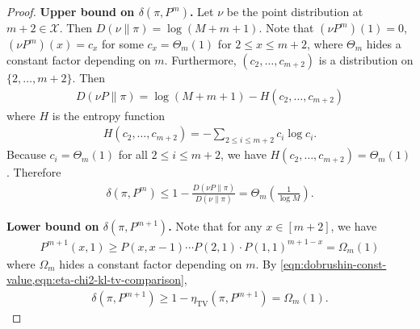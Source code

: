 \documentclass[11pt]{article}
\def\cX{\mathcal{X}}
\DeclareMathOperator\TV{\mathrm{TV}}
\theoremstyle{definition}
\begin{document}
\begin{proof}
  \textbf{Upper bound on $\delta\left(\pi, P^m\right)$.}
  Let $\nu$ be the point distribution at $m+2\in \cX$. Then $D(\nu \| \pi) = \log (M+m+1)$.
  Note that $(\nu P^m)(1)=0$, $(\nu P^m)(x) = c_x$ for some $c_x = \Theta_m(1)$ for $2\le x\le m+2$, where $\Theta_m$ hides a constant factor depending on $m$. Furthermore, $(c_2,\ldots,c_{m+2})$ is a distribution on $\{2,\ldots,m+2\}$.
  Then
  \begin{align}
    D(\nu P \| \pi) = \log (M+m+1) - H(c_2,\ldots,c_{m+2})
  \end{align}
  where $H$ is the entropy function
  \begin{align}
    H(c_2,\ldots,c_{m+2}) = -\sum_{2\le i\le m+2} c_i \log c_i.
  \end{align}
  Because $c_i=\Theta_m(1)$ for all $2\le i\le m+2$, we have $H(c_2,\ldots,c_{m+2}) = \Theta_m(1)$.
  Therefore
  \begin{align} \label{eqn:birth-death-delta-m-upper-bound}
    \delta\left(\pi, P^m\right) \le 1-\frac{D(\nu P\| \pi)}{D(\nu \| \pi)} = \Theta_m\left(\frac 1{\log M}\right).
  \end{align}

  \textbf{Lower bound on $\delta\left(\pi, P^{m+1}\right)$.}
  Note that for any $x\in [m+2]$, we have
  \begin{align}
    P^{m+1}(x,1) \ge P(x,x-1)\cdots P(2,1) \cdot P(1,1)^{m+1-x} = \Omega_m(1)
  \end{align}
  where $\Omega_m$ hides a constant factor depending on $m$.
  By \cref{eqn:dobrushin-const-value,eqn:eta-chi2-kl-tv-comparison},
  \begin{align} \label{eqn:birth-death-delta-m1-lower-bound}
    \delta\left(\pi, P^{m+1}\right) \ge 1-\eta_{\TV}(\pi, P^{m+1}) = \Omega_m(1).
  \end{align}
\end{proof}
\end{document}

